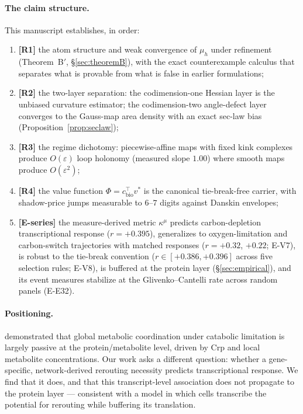 \documentclass[11pt,a4paper]{article}
\theoremstyle{plain}
\theoremstyle{definition}
\theoremstyle{remark}
\newcommand{\kmu}{\kappa^{\mu}}
\begin{document}
\paragraph{The claim structure.}
This manuscript establishes, in order:
\begin{enumerate}[label=(\roman*)]
\item \textbf{[R1]} the atom structure and weak convergence of $\mu_h$
      under refinement (Theorem~B$'$, \S\ref{sec:theoremB}), with the
      exact counterexample calculus that separates what is provable from
      what is false in earlier formulations;
\item \textbf{[R2]} the two-layer separation: the codimension-one Hessian
      layer is the unbiased curvature estimator; the codimension-two
      angle-defect layer converges to the Gauss-map area density with an
      exact sec-law bias (Proposition~\ref{prop:seclaw});
\item \textbf{[R3]} the regime dichotomy: piecewise-affine maps with fixed
      kink complexes produce $O(\varepsilon)$ loop holonomy (measured slope
      $1.00$) where smooth maps produce $O(\varepsilon^2)$;
\item \textbf{[R4]} the value function $\Phi = c_{\mathrm{bio}}^\top v^*$
      is the canonical tie-break-free carrier, with shadow-price jumps
      measurable to $6$--$7$ digits against Danskin envelopes;
\item \textbf{[E-series]} the measure-derived metric $\kmu$ predicts
      carbon-depletion transcriptional response ($r = +0.395$),
      generalizes to oxygen-limitation and carbon-switch trajectories
      with matched responses ($r = +0.32$, $+0.22$; E-V7), is robust
      to the tie-break convention ($r \in [+0.386, +0.396]$ across
      five selection rules; E-V8), is buffered at the protein layer
      (\S\ref{sec:empirical}), and its event measures stabilize at
      the Glivenko--Cantelli rate across random panels (E-E32).
\end{enumerate}

\paragraph{Positioning.}
\citet{kochanowski2013} demonstrated that global metabolic coordination under
catabolic limitation is largely passive at the protein/metabolite level,
driven by Crp and local metabolite concentrations. Our work asks a
different question: whether a gene-specific, network-derived rerouting
necessity predicts transcriptional response. We find that it does, and that
this transcript-level association does not propagate to the protein layer
--- consistent with a model in which cells transcribe the potential for
rerouting while buffering its translation.
\end{document}
